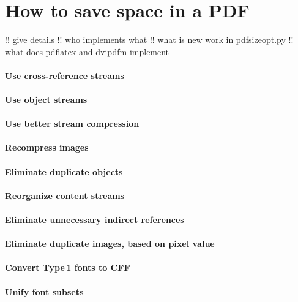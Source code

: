 \documentclass{article}
\begin{document}
\section{How to save space in a PDF}

!! give details
!! who implements what
!! what is new work in pdfsizeopt.py
!! what does pdflatex and dvipdfm implement

\paragraph{Use cross-reference streams}

\paragraph{Use object streams}

\paragraph{Use better stream compression}

\paragraph{Recompress images}

\paragraph{Eliminate duplicate objects}

\paragraph{Reorganize content streams}

\paragraph{Eliminate unnecessary indirect references}

\paragraph{Eliminate duplicate images, based on pixel value}

\paragraph{Convert Type\,1 fonts to CFF}

\paragraph{Unify font subsets}
\end{document}
